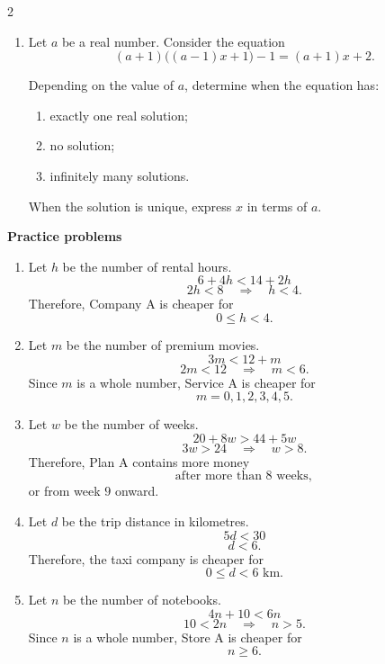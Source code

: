 \begin{multicols}{2}
\begin{enumerate}[label=\textbf{\arabic*.}]
			\item Let $a$ be a real number. Consider the equation
			\[
			(a+1)\bigl((a-1)x+1\bigr)-1
			=
			(a+1)x+2.
			\]
			
			Depending on the value of $a$, determine when the equation has:
			\begin{enumerate}[label=(\alph*)]
				\item exactly one real solution;
				\item no solution;
				\item infinitely many solutions.
			\end{enumerate}
			
			When the solution is unique, express $x$ in terms of $a$.
			
		\end{enumerate}
		
		
		\newpage
		
		
		\textbf{Practice problems}
		
		\begin{enumerate}[label=\textbf{\arabic*.}]
			
			\item Let $h$ be the number of rental hours.
			\[
			6+4h<14+2h
			\]
			\[
			2h<8
			\quad\Longrightarrow\quad
			h<4.
			\]
			Therefore, Company A is cheaper for
			\[
			\boxed{0\leq h<4}.
			\]
			
			\item Let $m$ be the number of premium movies.
			\[
			3m<12+m
			\]
			\[
			2m<12
			\quad\Longrightarrow\quad
			m<6.
			\]
			Since $m$ is a whole number, Service A is cheaper for
			\[
			\boxed{m=0,1,2,3,4,5}.
			\]
			
			\item Let $w$ be the number of weeks.
			\[
			20+8w>44+5w
			\]
			\[
			3w>24
			\quad\Longrightarrow\quad
			w>8.
			\]
			Therefore, Plan A contains more money
			\[
			\boxed{\text{after more than 8 weeks}},
			\]
			or from week $9$ onward.
			
			\item Let $d$ be the trip distance in kilometres.
			\[
			5d<30
			\]
			\[
			d<6.
			\]
			Therefore, the taxi company is cheaper for
			\[
			\boxed{0\leq d<6\text{ km}}.
			\]
			
			\item Let $n$ be the number of notebooks.
			\[
			4n+10<6n
			\]
			\[
			10<2n
			\quad\Longrightarrow\quad
			n>5.
			\]
			Since $n$ is a whole number, Store A is cheaper for
			\[
			\boxed{n\geq 6}.
			\]
			

\end{enumerate}
\end{multicols}
